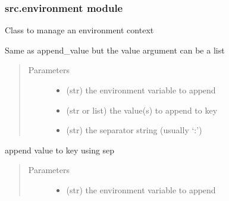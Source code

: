 \documentclass[a4paper,10pt,english]{sphinxmanual}
\begin{document}
\subsubsection{src.environment module}
\label{\detokenize{apidoc_src/src:src-environment-module}}\label{\detokenize{apidoc_src/src:module-src.environment}}

\begin{fulllineitems}
\label{\detokenize{apidoc_src/src:src.environment.Environ}}
Class to manage an environment context

\begin{fulllineitems}
\label{\detokenize{apidoc_src/src:src.environment.Environ.append}}
Same as append\_value but the value argument can be a list
\begin{quote}\begin{description}
\item[{Parameters}] \leavevmode\begin{itemize}
\item {} 
 \textendash{} (str) the environment variable to append

\item {} 
 \textendash{} (str or list) the value(s) to append to key

\item {} 
 \textendash{} (str) the separator string (usually ‘:’)

\end{itemize}

\end{description}\end{quote}

\end{fulllineitems}


\begin{fulllineitems}
\label{\detokenize{apidoc_src/src:src.environment.Environ.append_value}}
append value to key using sep
\begin{quote}\begin{description}
\item[{Parameters}] \leavevmode\begin{itemize}
\item {} 
 \textendash{} (str) the environment variable to append


\end{itemize}
\end{description}
\end{quote}
\end{fulllineitems}
\end{fulllineitems}
\end{document}

